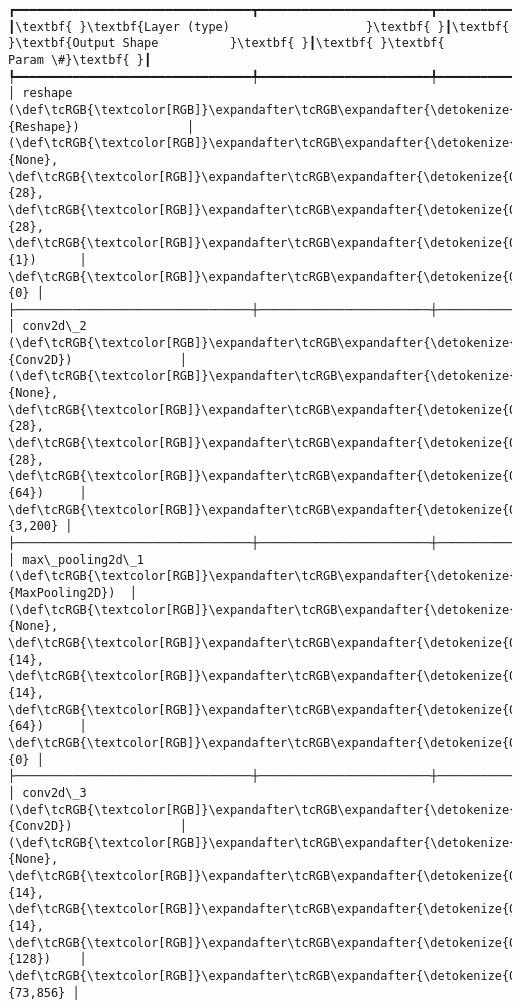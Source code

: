 \documentclass[12pt letter]{report}
\begin{document}
    \begin{Verbatim}[commandchars=\\\{\}]
┏━━━━━━━━━━━━━━━━━━━━━━━━━━━━━━━━━┳━━━━━━━━━━━━━━━━━━━━━━━━┳━━━━━━━━━━━━━━━┓
┃\textbf{ }\textbf{Layer (type)                   }\textbf{ }┃\textbf{ }\textbf{Output Shape          }\textbf{ }┃\textbf{ }\textbf{      Param \#}\textbf{ }┃
┡━━━━━━━━━━━━━━━━━━━━━━━━━━━━━━━━━╇━━━━━━━━━━━━━━━━━━━━━━━━╇━━━━━━━━━━━━━━━┩
│ reshape (\def\tcRGB{\textcolor[RGB]}\expandafter\tcRGB\expandafter{\detokenize{0,135,255}}{Reshape})               │ (\def\tcRGB{\textcolor[RGB]}\expandafter\tcRGB\expandafter{\detokenize{0,215,255}}{None}, \def\tcRGB{\textcolor[RGB]}\expandafter\tcRGB\expandafter{\detokenize{0,175,0}}{28}, \def\tcRGB{\textcolor[RGB]}\expandafter\tcRGB\expandafter{\detokenize{0,175,0}}{28}, \def\tcRGB{\textcolor[RGB]}\expandafter\tcRGB\expandafter{\detokenize{0,175,0}}{1})      │             \def\tcRGB{\textcolor[RGB]}\expandafter\tcRGB\expandafter{\detokenize{0,175,0}}{0} │
├─────────────────────────────────┼────────────────────────┼───────────────┤
│ conv2d\_2 (\def\tcRGB{\textcolor[RGB]}\expandafter\tcRGB\expandafter{\detokenize{0,135,255}}{Conv2D})               │ (\def\tcRGB{\textcolor[RGB]}\expandafter\tcRGB\expandafter{\detokenize{0,215,255}}{None}, \def\tcRGB{\textcolor[RGB]}\expandafter\tcRGB\expandafter{\detokenize{0,175,0}}{28}, \def\tcRGB{\textcolor[RGB]}\expandafter\tcRGB\expandafter{\detokenize{0,175,0}}{28}, \def\tcRGB{\textcolor[RGB]}\expandafter\tcRGB\expandafter{\detokenize{0,175,0}}{64})     │         \def\tcRGB{\textcolor[RGB]}\expandafter\tcRGB\expandafter{\detokenize{0,175,0}}{3,200} │
├─────────────────────────────────┼────────────────────────┼───────────────┤
│ max\_pooling2d\_1 (\def\tcRGB{\textcolor[RGB]}\expandafter\tcRGB\expandafter{\detokenize{0,135,255}}{MaxPooling2D})  │ (\def\tcRGB{\textcolor[RGB]}\expandafter\tcRGB\expandafter{\detokenize{0,215,255}}{None}, \def\tcRGB{\textcolor[RGB]}\expandafter\tcRGB\expandafter{\detokenize{0,175,0}}{14}, \def\tcRGB{\textcolor[RGB]}\expandafter\tcRGB\expandafter{\detokenize{0,175,0}}{14}, \def\tcRGB{\textcolor[RGB]}\expandafter\tcRGB\expandafter{\detokenize{0,175,0}}{64})     │             \def\tcRGB{\textcolor[RGB]}\expandafter\tcRGB\expandafter{\detokenize{0,175,0}}{0} │
├─────────────────────────────────┼────────────────────────┼───────────────┤
│ conv2d\_3 (\def\tcRGB{\textcolor[RGB]}\expandafter\tcRGB\expandafter{\detokenize{0,135,255}}{Conv2D})               │ (\def\tcRGB{\textcolor[RGB]}\expandafter\tcRGB\expandafter{\detokenize{0,215,255}}{None}, \def\tcRGB{\textcolor[RGB]}\expandafter\tcRGB\expandafter{\detokenize{0,175,0}}{14}, \def\tcRGB{\textcolor[RGB]}\expandafter\tcRGB\expandafter{\detokenize{0,175,0}}{14}, \def\tcRGB{\textcolor[RGB]}\expandafter\tcRGB\expandafter{\detokenize{0,175,0}}{128})    │        \def\tcRGB{\textcolor[RGB]}\expandafter\tcRGB\expandafter{\detokenize{0,175,0}}{73,856} │

\end{Verbatim}
\end{document}
